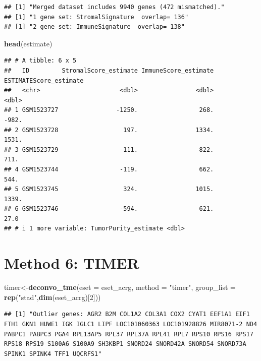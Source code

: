 \documentclass[
  12pt,
]{book}
\newenvironment{Shaded}{\begin{snugshade}}{\end{snugshade}}
\newcommand{\AttributeTok}[1]{\textcolor[rgb]{0.13,0.29,0.53}{#1}}
\newcommand{\DecValTok}[1]{\textcolor[rgb]{0.00,0.00,0.81}{#1}}
\newcommand{\FunctionTok}[1]{\textcolor[rgb]{0.13,0.29,0.53}{\textbf{#1}}}
\newcommand{\NormalTok}[1]{#1}
\newcommand{\OtherTok}[1]{\textcolor[rgb]{0.56,0.35,0.01}{#1}}
\newcommand{\StringTok}[1]{\textcolor[rgb]{0.31,0.60,0.02}{#1}}
\theoremstyle{definition}
\theoremstyle{definition}
\theoremstyle{definition}
\theoremstyle{definition}
\theoremstyle{remark}
\begin{document}
\begin{verbatim}
## [1] "Merged dataset includes 9940 genes (472 mismatched)."
## [1] "1 gene set: StromalSignature  overlap= 136"
## [1] "2 gene set: ImmuneSignature  overlap= 138"
\end{verbatim}

\begin{Shaded}
\begin{Highlighting}[]
\FunctionTok{head}\NormalTok{(estimate)}
\end{Highlighting}
\end{Shaded}

\begin{verbatim}
## # A tibble: 6 x 5
##   ID         StromalScore_estimate ImmuneScore_estimate ESTIMATEScore_estimate
##   <chr>                      <dbl>                <dbl>                  <dbl>
## 1 GSM1523727                -1250.                 268.                 -982. 
## 2 GSM1523728                  197.                1334.                 1531. 
## 3 GSM1523729                 -111.                 822.                  711. 
## 4 GSM1523744                 -119.                 662.                  544. 
## 5 GSM1523745                  324.                1015.                 1339. 
## 6 GSM1523746                 -594.                 621.                   27.0
## # i 1 more variable: TumorPurity_estimate <dbl>
\end{verbatim}

\hypertarget{method-6-timer}{%
\section{Method 6: TIMER}\label{method-6-timer}}

\begin{Shaded}
\begin{Highlighting}[]
\NormalTok{timer}\OtherTok{\textless{}{-}}\FunctionTok{deconvo\_tme}\NormalTok{(}\AttributeTok{eset =}\NormalTok{ eset\_acrg, }\AttributeTok{method =} \StringTok{"timer"}\NormalTok{, }\AttributeTok{group\_list =} \FunctionTok{rep}\NormalTok{(}\StringTok{"stad"}\NormalTok{,}\FunctionTok{dim}\NormalTok{(eset\_acrg)[}\DecValTok{2}\NormalTok{]))}
\end{Highlighting}
\end{Shaded}

\begin{verbatim}
## [1] "Outlier genes: AGR2 B2M COL1A2 COL3A1 COX2 CYAT1 EEF1A1 EIF1 FTH1 GKN1 HUWE1 IGK IGLC1 LIPF LOC101060363 LOC101928826 MIR8071-2 ND4 PABPC1 PABPC3 PGA4 RPL13AP5 RPL37 RPL37A RPL41 RPL7 RPS10 RPS16 RPS17 RPS18 RPS19 S100A6 S100A9 SH3KBP1 SNORD24 SNORD42A SNORD54 SNORD73A SPINK1 SPINK4 TFF1 UQCRFS1"
\end{verbatim}
\end{document}
